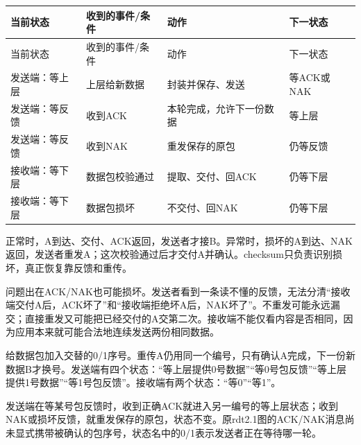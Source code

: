\begingroup
\small\setlength{\tabcolsep}{3pt}
\renewcommand{\arraystretch}{1.22}
\begin{longtable}{@{}>{\raggedright\arraybackslash}p{}>{\raggedright\arraybackslash}p{}>{\raggedright\arraybackslash}p{}>{\raggedright\arraybackslash}p{}@{}}
\toprule
当前状态 & 收到的事件/条件 & 动作 & 下一状态 \\
\midrule\endfirsthead
当前状态 & 收到的事件/条件 & 动作 & 下一状态 \\
\midrule\endhead
\bottomrule\endfoot
发送端：等上层 & 上层给新数据 & 封装并保存、发送 & 等ACK或NAK \\
发送端：等反馈 & 收到ACK & 本轮完成，允许下一份数据 & 等上层 \\
发送端：等反馈 & 收到NAK & 重发保存的原包 & 仍等反馈 \\
接收端：等下层 & 数据包校验通过 & 提取、交付、回ACK & 仍等下层 \\
接收端：等下层 & 数据包损坏 & 不交付、回NAK & 仍等下层 \\
\end{longtable}
\endgroup


正常时，A到达、交付、ACK返回，发送者才接B。异常时，损坏的A到达、NAK返回，发送者重发A；这次校验通过后才交付A并确认。checksum只负责识别损坏，真正恢复靠反馈和重传。


问题出在ACK/NAK也可能损坏。发送者看到一条读不懂的反馈，无法分清“接收端交付A后，ACK坏了”和“接收端拒绝坏A后，NAK坏了”。不重发可能永远漏交；直接重发又可能把已经交付的A交第二次。接收端不能仅看内容是否相同，因为应用本来就可能合法地连续发送两份相同数据。





给数据包加入交替的0/1序号。重传A仍用同一个编号，只有确认A完成，下一份新数据B才换号。发送端有四个状态：“等上层提供0号数据”“等0号包反馈”“等上层提供1号数据”“等1号包反馈”。接收端有两个状态：“等0”“等1”。


发送端在等某号包反馈时，收到正确ACK就进入另一编号的等上层状态；收到NAK或损坏反馈，就重发保存的原包，状态不变。原rdt2.1图的ACK/NAK消息尚未显式携带被确认的包序号，状态名中的0/1表示发送者正在等待哪一轮。


